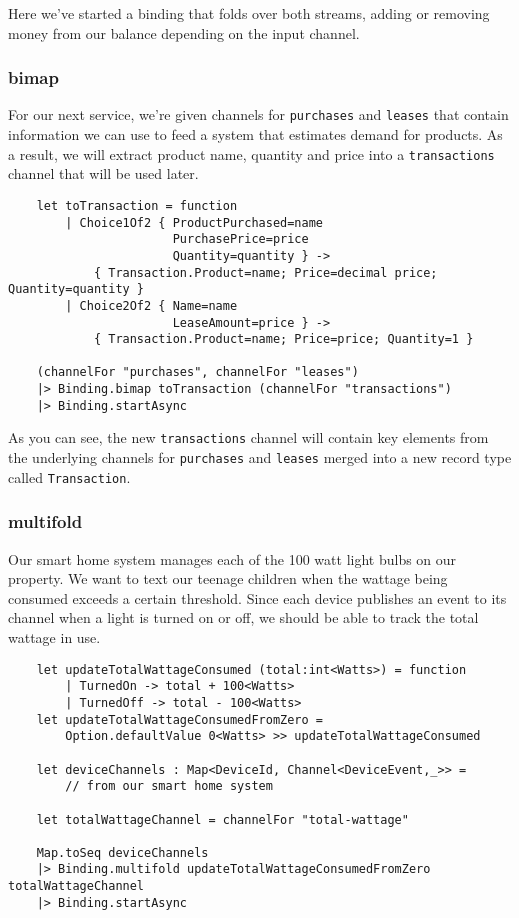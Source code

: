 \documentclass{article}
\begin{document}
Here we've started a binding that folds over both streams, adding or removing money from our balance depending on the input channel.

\subsubsection{bimap}

For our next service, we're given channels for \texttt{purchases} and \texttt{leases} that contain information we can use to feed a system that estimates demand for products.  As a result, we will extract product name, quantity and price into a \texttt{transactions} channel that will be used later.

\begin{verbatim}
    let toTransaction = function
        | Choice1Of2 { ProductPurchased=name
                       PurchasePrice=price
                       Quantity=quantity } ->
            { Transaction.Product=name; Price=decimal price; Quantity=quantity }
        | Choice2Of2 { Name=name
                       LeaseAmount=price } ->
            { Transaction.Product=name; Price=price; Quantity=1 }

    (channelFor "purchases", channelFor "leases")
    |> Binding.bimap toTransaction (channelFor "transactions")
    |> Binding.startAsync
\end{verbatim}

As you can see, the new \texttt{transactions} channel will contain key elements from the underlying channels for \texttt{purchases} and \texttt{leases} merged into a new record type called \texttt{Transaction}.

\subsubsection{multifold}

Our smart home system manages each of the 100 watt light bulbs on our property.  We want to text our teenage children when the wattage being consumed exceeds a certain threshold.  Since each device publishes an event to its channel when a light is turned on or off, we should be able to track the total wattage in use.

\begin{verbatim}
    let updateTotalWattageConsumed (total:int<Watts>) = function
        | TurnedOn -> total + 100<Watts>
        | TurnedOff -> total - 100<Watts>
    let updateTotalWattageConsumedFromZero =
        Option.defaultValue 0<Watts> >> updateTotalWattageConsumed

    let deviceChannels : Map<DeviceId, Channel<DeviceEvent,_>> =
        // from our smart home system

    let totalWattageChannel = channelFor "total-wattage"

    Map.toSeq deviceChannels
    |> Binding.multifold updateTotalWattageConsumedFromZero totalWattageChannel
    |> Binding.startAsync
\end{verbatim}
\end{document}
